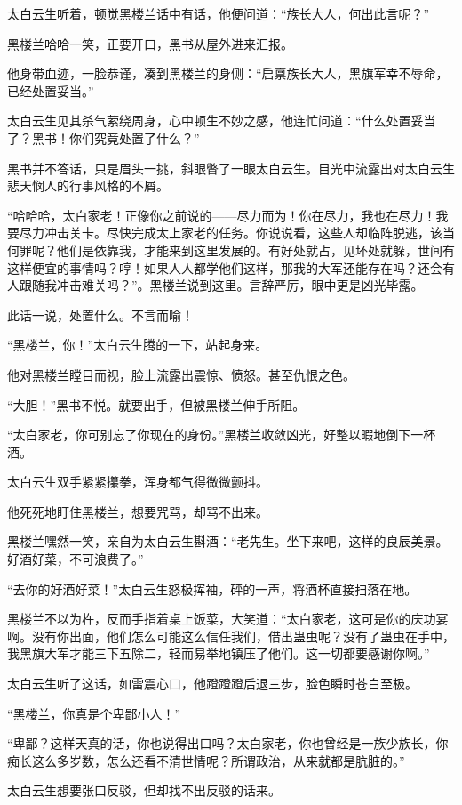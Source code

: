 \begin{this_body}
太白云生听着，顿觉黑楼兰话中有话，他便问道：“族长大人，何出此言呢？”

黑楼兰哈哈一笑，正要开口，黑书从屋外进来汇报。

他身带血迹，一脸恭谨，凑到黑楼兰的身侧：“启禀族长大人，黑旗军幸不辱命，已经处置妥当。”

太白云生见其杀气萦绕周身，心中顿生不妙之感，他连忙问道：“什么处置妥当了？黑书！你们究竟处置了什么？”

黑书并不答话，只是眉头一挑，斜眼瞥了一眼太白云生。目光中流露出对太白云生悲天悯人的行事风格的不屑。

“哈哈哈，太白家老！正像你之前说的——尽力而为！你在尽力，我也在尽力！我要尽力冲击关卡。尽快完成太上家老的任务。你说说看，这些人却临阵脱逃，该当何罪呢？他们是依靠我，才能来到这里发展的。有好处就占，见坏处就躲，世间有这样便宜的事情吗？哼！如果人人都学他们这样，那我的大军还能存在吗？还会有人跟随我冲击难关吗？”。黑楼兰说到这里。言辞严厉，眼中更是凶光毕露。

此话一说，处置什么。不言而喻！

“黑楼兰，你！”太白云生腾的一下，站起身来。

他对黑楼兰瞠目而视，脸上流露出震惊、愤怒。甚至仇恨之色。

“大胆！”黑书不悦。就要出手，但被黑楼兰伸手所阻。

“太白家老，你可别忘了你现在的身份。”黑楼兰收敛凶光，好整以暇地倒下一杯酒。

太白云生双手紧紧攥拳，浑身都气得微微颤抖。

他死死地盯住黑楼兰，想要咒骂，却骂不出来。

黑楼兰嘿然一笑，亲自为太白云生斟酒：“老先生。坐下来吧，这样的良辰美景。好酒好菜，不可浪费了。”

“去你的好酒好菜！”太白云生怒极挥袖，砰的一声，将酒杯直接扫落在地。

黑楼兰不以为杵，反而手指着桌上饭菜，大笑道：“太白家老，这可是你的庆功宴啊。没有你出面，他们怎么可能这么信任我们，借出蛊虫呢？没有了蛊虫在手中，我黑旗大军才能三下五除二，轻而易举地镇压了他们。这一切都要感谢你啊。”

太白云生听了这话，如雷震心口，他蹬蹬蹬后退三步，脸色瞬时苍白至极。

“黑楼兰，你真是个卑鄙小人！”

“卑鄙？这样天真的话，你也说得出口吗？太白家老，你也曾经是一族少族长，你痴长这么多岁数，怎么还看不清世情呢？所谓政治，从来就都是肮脏的。”

太白云生想要张口反驳，但却找不出反驳的话来。


\end{this_body}
